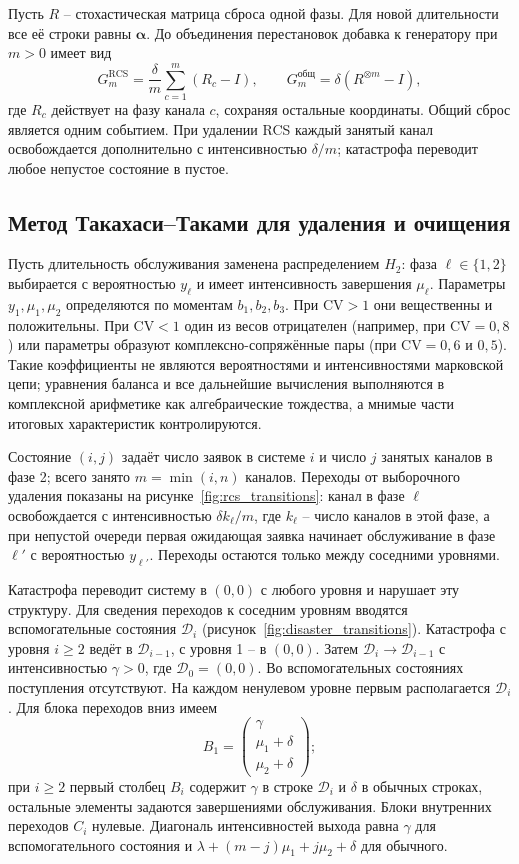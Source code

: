 Пусть \(R\) -- стохастическая матрица сброса одной фазы. Для новой длительности все её строки равны \(\boldsymbol\alpha\). До объединения перестановок добавка к генератору при \(m>0\) имеет вид
\[
G_m^{\mathrm{RCS}}=\frac{\delta}{m}\sum_{c=1}^{m}(R_c-I),\qquad
G_m^{\text{общ}}=\delta(R^{\otimes m}-I),
\]
где \(R_c\) действует на фазу канала \(c\), сохраняя остальные координаты. Общий сброс является одним событием. При удалении RCS каждый занятый канал освобождается дополнительно с интенсивностью \(\delta/m\); катастрофа переводит любое непустое состояние в пустое.

\subsection{Метод Такахаси--Таками для удаления и очищения}\label{sec:tt}
Пусть длительность обслуживания заменена распределением \(H_2\): фаза \(\ell\in\{1,2\}\) выбирается с вероятностью \(y_\ell\) и имеет интенсивность завершения \(\mu_\ell\). Параметры \(y_1,\mu_1,\mu_2\) определяются по моментам \(b_1,b_2,b_3\). При \(\mathrm{CV}>1\) они вещественны и положительны. При \(\mathrm{CV}<1\) один из весов отрицателен (например, при \(\mathrm{CV}=0{,}8\)) или параметры образуют комплексно-сопряжённые пары (при \(\mathrm{CV}=0{,}6\) и \(0{,}5\)). Такие коэффициенты не являются вероятностями и интенсивностями марковской цепи; уравнения баланса и все дальнейшие вычисления выполняются в комплексной арифметике как алгебраические тождества, а мнимые части итоговых характеристик контролируются.

Состояние \((i,j)\) задаёт число заявок в системе \(i\) и число \(j\) занятых каналов в фазе 2; всего занято \(m=\min(i,n)\) каналов. Переходы от выборочного удаления показаны на рисунке~\ref{fig:rcs_transitions}: канал в фазе \(\ell\) освобождается с интенсивностью \(\delta k_\ell/m\), где \(k_\ell\) -- число каналов в этой фазе, а при непустой очереди первая ожидающая заявка начинает обслуживание в фазе \(\ell'\) с вероятностью \(y_{\ell'}\). Переходы остаются только между соседними уровнями.

Катастрофа переводит систему в \((0,0)\) с любого уровня и нарушает эту структуру. Для сведения переходов к соседним уровням вводятся вспомогательные состояния \(\mathcal D_i\) (рисунок~\ref{fig:disaster_transitions}). Катастрофа с уровня \(i\ge2\) ведёт в \(\mathcal D_{i-1}\), с уровня 1 -- в \((0,0)\). Затем \(\mathcal D_i\to\mathcal D_{i-1}\) с интенсивностью \(\gamma>0\), где \(\mathcal D_0=(0,0)\). Во вспомогательных состояниях поступления отсутствуют. На каждом ненулевом уровне первым располагается \(\mathcal D_i\). Для блока переходов вниз имеем
\[
B_1=\begin{pmatrix}\gamma\\\mu_1+\delta\\\mu_2+\delta\end{pmatrix};
\]
при \(i\ge2\) первый столбец \(B_i\) содержит \(\gamma\) в строке \(\mathcal D_i\) и \(\delta\) в обычных строках, остальные элементы задаются завершениями обслуживания. Блоки внутренних переходов \(C_i\) нулевые. Диагональ интенсивностей выхода равна \(\gamma\) для вспомогательного состояния и \(\lambda+(m-j)\mu_1+j\mu_2+\delta\) для обычного.

